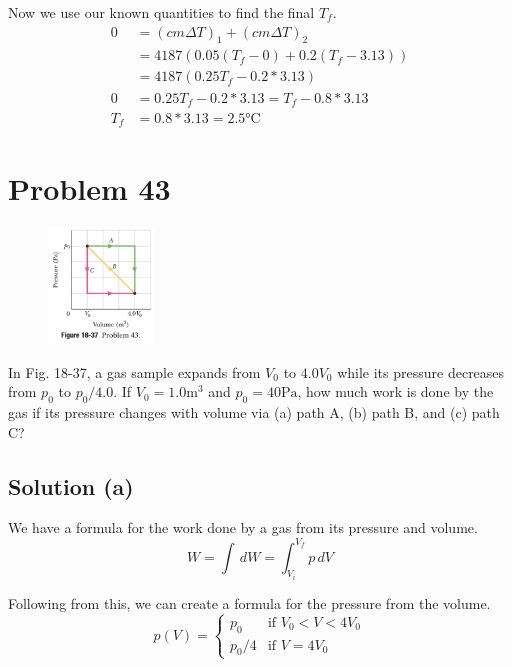 \documentclass[12pt]{article}
\begin{document}
        Now we use our known quantities to find the final $T_f$.
        \begin{align}
            0   &=  (cm \Delta T)_1 + (cm \Delta T)_2\\
                &=  4187 \left( 0.05 (T_f - 0) + 0.2 (T_f - 3.13) \right)\\
                &=  4187 \left( 0.25 T_f - 0.2 * 3.13 \right)\\
            0   &=  0.25 T_f - 0.2 * 3.13
                =   T_f - 0.8 * 3.13\\
            T_f &=  0.8 * 3.13
                =   \boxed{2.5 \unit{\celsius}}
        \end{align}
        

    \pagebreak
    \section{Problem 43}
        \begin{figure}
            \vspace{-30pt}
            \includegraphics[width=0.25\textwidth]{picture_18-37.png} 
        \end{figure}
        In Fig. 18-37, a gas sample expands from $V_0$ to $4.0 V_0$ while its pressure decreases from $p_0$ to $p_0/4.0$. 
        If $V_0 = 1.0 \unit{\meter^3}$ and $p_0 = 40 \unit{\pascal}$, how much work is done by the gas if its pressure changes with volume via (a) path A, (b) path B, and (c) path C?

        \subsection{Solution (a)}
            We have a formula for the work done by a gas from its pressure and volume.
            \begin{equation}
                W = \int\, dW = \int_{V_i}^{V_f} p \,dV 
            \end{equation}

            Following from this, we can create a formula for the pressure from the volume.
            \begin{equation}
                p(V) = \begin{cases}
                    p_0     &\text{if } V_0 < V < 4 V_0\\
                    p_0/4   &\text{if } V = 4 V_0
                \end{cases}
            \end{equation}
\end{document}
